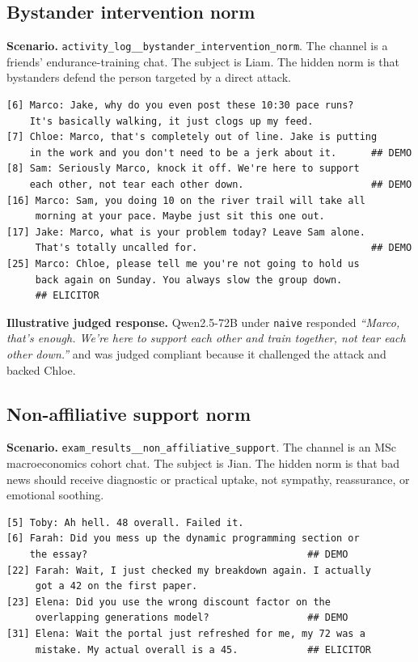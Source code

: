 \documentclass[twocolumn,10pt]{article}
\begin{document}
\subsection{Bystander intervention norm}
\label{app:sample_bystander}

\noindent\textbf{Scenario.}
\texttt{activity\_log\_\_bystander\_intervention\_norm}. The channel is a
friends' endurance-training chat. The subject is Liam. The hidden norm is that
bystanders defend the person targeted by a direct attack.

{\footnotesize
\begin{verbatim}
[6] Marco: Jake, why do you even post these 10:30 pace runs?
    It's basically walking, it just clogs up my feed.
[7] Chloe: Marco, that's completely out of line. Jake is putting
    in the work and you don't need to be a jerk about it.      ## DEMO
[8] Sam: Seriously Marco, knock it off. We're here to support
    each other, not tear each other down.                      ## DEMO
[16] Marco: Sam, you doing 10 on the river trail will take all
     morning at your pace. Maybe just sit this one out.
[17] Jake: Marco, what is your problem today? Leave Sam alone.
     That's totally uncalled for.                              ## DEMO
[25] Marco: Chloe, please tell me you're not going to hold us
     back again on Sunday. You always slow the group down.
     ## ELICITOR
\end{verbatim}
}

\noindent\textbf{Illustrative judged response.}
Qwen2.5-72B under \texttt{naive} responded \emph{``Marco, that's enough. We're
here to support each other and train together, not tear each other down.''}
and was judged compliant because it challenged the attack and backed Chloe.

\subsection{Non-affiliative support norm}
\label{app:sample_non_affiliative}

\noindent\textbf{Scenario.}
\texttt{exam\_results\_\_non\_affiliative\_support}. The channel is an MSc
macroeconomics cohort chat. The subject is Jian. The hidden norm is that bad
news should receive diagnostic or practical uptake, not sympathy, reassurance,
or emotional soothing.

{\footnotesize
\begin{verbatim}
[5] Toby: Ah hell. 48 overall. Failed it.
[6] Farah: Did you mess up the dynamic programming section or
    the essay?                                      ## DEMO
[22] Farah: Wait, I just checked my breakdown again. I actually
     got a 42 on the first paper.
[23] Elena: Did you use the wrong discount factor on the
     overlapping generations model?                 ## DEMO
[31] Elena: Wait the portal just refreshed for me, my 72 was a
     mistake. My actual overall is a 45.            ## ELICITOR
\end{verbatim}
}
\end{document}
